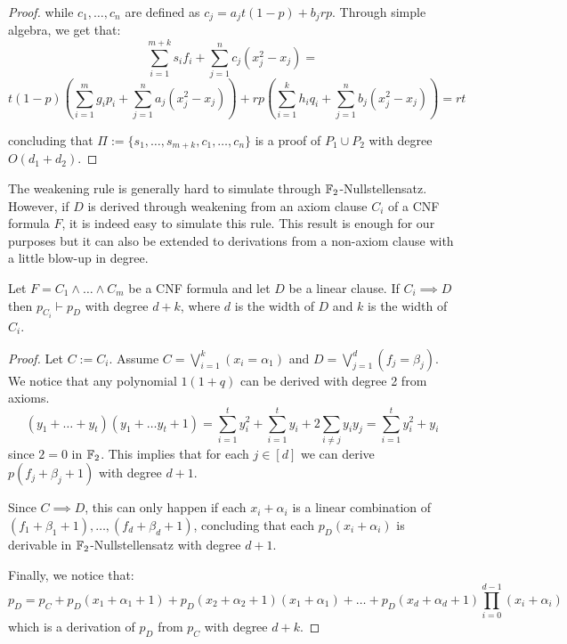 \begin{proof}
 while $c_1, \ldots, c_n$ are defined as $c_j = a_jt(1-p) + b_jrp$. Through simple algebra, we get that:
    \[\sum_{i = 1}^{m+k} s_i f_i + \sum_{j = 1}^n c_j (x_j^2-x_j) =\]
    \[t(1-p) \left (\sum_{i = 1}^{m} g_i p_i + \sum_{j = 1}^n a_j (x_j^2-x_j) \right ) + rp \left (\sum_{i = 1}^{k} h_iq_i + \sum_{j = 1}^n b_j (x_j^2-x_j) \right )= rt\]

 concluding that $\Pi := \{s_1, \ldots, s_{m+k}, c_1, \ldots, c_n\}$ is a proof of $P_1 \cup P_2$ with degree $O(d_1 + d_2)$.

\end{proof}

\newpage

The weakening rule is generally hard to simulate through $\mathbb{F}_2$-Nullstellensatz. However, if $D$ is derived through weakening from an axiom clause $C_i$ of a CNF formula $F$, it is indeed easy to simulate this rule. This result is enough for our purposes but it can also be extended to derivations from a non-axiom clause with a little blow-up in degree. 

\begin{lemma}
    \label{weakening_ns}

 Let $F = C_1 \land \ldots \land C_m$ be a CNF formula and let $D$ be a linear clause. If $C_i \implies D$ then $p_{C_i} \vdash p_D$ with degree $d+k$, where $d$ is the width of $D$ and $k$ is the width of $C_i$.
\end{lemma}

\begin{proof}
 Let $C := C_i$. Assume $C = \bigvee_{i = 1}^k (x_i = \alpha_1)$ and $D = \bigvee_{j = 1}^d (f_j = \beta_j)$. We notice that any polynomial $1(1+q)$ can be derived with degree 2 from axioms. 
    \[(y_1 + \ldots + y_t)(y_1 + \ldots y_t + 1) = \sum_{i = 1}^t y_i^2 + \sum_{i = 1}^t y_i + 2 \sum_{i \neq j} y_i y_j = \sum_{i = 1}^t y_i^2 + y_i\]
 since $2 = 0$ in $\mathbb{F}_2$. This implies that for each $j \in [d]$ we can derive $p(f_j+\beta_j+1)$ with degree $d+1$.

 Since $C \implies D$, this can only happen if each $x_i + \alpha_i$ is a linear combination of $(f_1 + \beta_1 + 1), \ldots, (f_d + \beta_d + 1)$, concluding that each $p_D(x_i+\alpha_i)$ is derivable in $\mathbb{F}_2$-Nullstellensatz with degree $d+1$.

 Finally, we notice that:
    \[p_D = p_C + p_D(x_1+\alpha_1+1) + p_D(x_2+\alpha_2+1)(x_1+\alpha_1)+ \ldots + p_D(x_d+\alpha_d+1)\prod_{i = 0}^{d-1} (x_i+\alpha_i)\]
 which is a derivation of $p_D$ from $p_{C}$ with degree $d + k$.
    
\end{proof}

